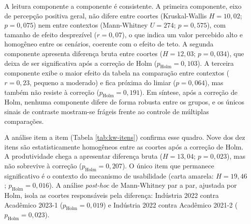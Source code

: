 \begin{table}[h!]
\centering
\captionsetup{width=15cm}
\caption{Mann-Whitney entre contextos (Acadêmico e Indústria), por componente principal}
\label{tab:mw-componentes}
\end{table}

\FloatBarrier

A leitura componente a componente é consistente. A primeira componente, eixo de percepção positiva geral, não difere entre coortes (Kruskal-Wallis $H = 10{,}02$; $p = 0{,}075$) nem entre contextos (Mann-Whitney $U = 274$; $p = 0{,}575$), com tamanho de efeito desprezível ($r = 0{,}07$), o que indica um valor percebido alto e homogêneo entre os cenários, coerente com o efeito de teto. A segunda componente apresenta diferença bruta entre coortes ($H = 12{,}03$; $p = 0{,}034$), que deixa de ser significativa após a correção de Holm ($p_{\text{Holm}} = 0{,}103$). A terceira componente exibe o maior efeito da tabela na comparação entre contextos ($r = 0{,}23$, pequeno a moderado) e fica próxima do limiar ($p = 0{,}064$), mas também não resiste à correção ($p_{\text{Holm}} = 0{,}191$). Em síntese, após a correção de Holm, nenhuma componente difere de forma robusta entre os grupos, e os únicos sinais de contraste mostram-se frágeis frente ao controle de múltiplas comparações.

A análise item a item (Tabela \ref{tab:kw-itens}) confirma esse quadro. Nove dos dez itens são estatisticamente homogêneos entre as coortes após a correção de Holm. A produtividade chega a apresentar diferença bruta ($H = 13{,}04$; $p = 0{,}023$), mas não sobrevive à correção ($p_{\text{Holm}} = 0{,}207$). O único item que permanece significativo é o contexto do mecanismo de usabilidade (carta amarela: $H = 19{,}46$; $p_{\text{Holm}} = 0{,}016$). A análise \textit{post-hoc} de Mann-Whitney par a par, ajustada por Holm, isola as coortes responsáveis pela diferença: Indústria 2022 contra Acadêmico 2023-1 ($p_{\text{Holm}} = 0{,}019$) e Indústria 2022 contra Acadêmico 2021-2 ($p_{\text{Holm}} = 0{,}023$).

